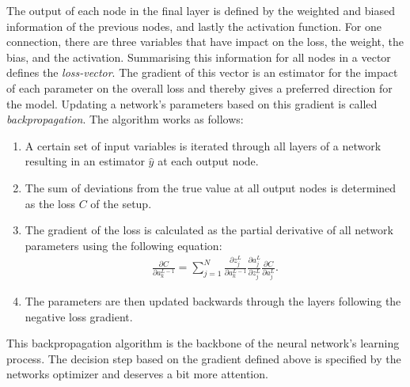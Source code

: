 The output of each node in the final layer is defined by the weighted and biased information of the previous nodes, and lastly the activation function. For one connection, there are three variables that have impact on the loss, the weight, the bias, and the activation. Summarising this information for all nodes in a vector defines the \emph{loss-vector}. The gradient of this vector is an estimator for the impact of each parameter on the overall loss and thereby gives a preferred direction for the model. Updating a network's parameters based on this gradient is called \emph{backpropagation}. The algorithm works as follows:

\begin{enumerate}
    \item A certain set of input variables is iterated through all layers of a network resulting in an estimator $\hat{y}$ at each output node.
    \item The sum of deviations from the true value at all output nodes is determined as the loss $C$ of the setup.
    \item The gradient of the loss is calculated as the partial derivative of all network parameters using the following equation:
    \begin{align*}
        \frac{\partial C}{\partial a_k^{L-1}} = \sum_{j=1}^N \frac{\partial z_j^L}{\partial a_k^{L-1}} \frac{\partial a_j^L}{\partial z_j^L}\frac{\partial C}{\partial a_j^L}.
    \end{align*}
    \item The parameters are then updated backwards through the layers following the negative loss gradient.
\end{enumerate}
This backpropagation algorithm is the backbone of the neural network's learning process. The decision step based on the gradient defined above is specified by the networks optimizer and deserves a bit more attention.

